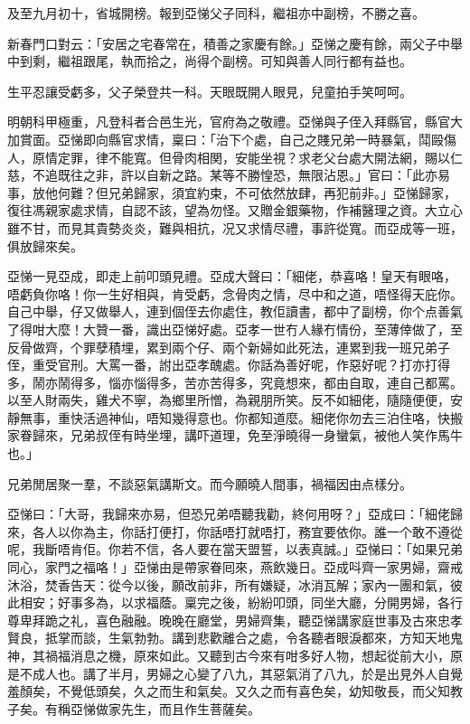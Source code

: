 \documentclass[a5paper, 12pt, openany]{book} %
\begin{document}
	及至九月初十，省城開榜。報到亞悌父子同科，繼祖亦中副榜，不勝之喜。

	新春門口對云：「安居之宅春常在，積善之家慶有餘。」亞悌之慶有餘，兩父子中舉中到剩，繼祖跟尾，執而拾之，尚得个副榜。可知與善人同行都有益也。

	生平忍讓受虧多，父子榮登共一科。天眼既開人眼見，兒童拍手笑呵呵。

	明朝科甲極重，凡登科者合邑生光，官府為之敬禮。亞悌與子侄入拜縣官，縣官大加賞面。亞悌即向縣官求情，稟曰：「治下个處，自己之賤兄弟一時暴氣，鬦毆傷人，原情定罪，律不能寬。但骨肉相関，安能坐視？求老父台處大開法網，賜以仁慈，不追既往之非，許以自新之路。某等不勝惶恐，無限沾恩。」官曰：「此亦易事，放他何難？但兄弟歸家，須宜約束，不可依然放肆，再犯前非。」亞悌歸家，復往馮親家處求情，自認不該，望為勿怪。又贈金銀藥物，作補醫理之資。大立心雖不甘，而見其貴勢炎炎，難與相抗，况又求情尽禮，事許從寬。而亞成等一班，俱放歸來矣。

	亞悌一見亞成，即走上前叩頭見禮。亞成大聲曰：「細佬，恭喜咯！皇天有眼咯，唔虧負你咯！你一生好相與，肯受虧，念骨肉之情，尽中和之道，唔怪得天庇你。自己中舉，仔又做舉人，連到個侄去你處住，教佢讀書，都中了副榜，你个点善氣了得咁大麼！大贊一番，識出亞悌好處。亞孝一世冇人緣冇情份，至薄倖做了，至反骨做齊，个罪孽積埋，累到兩个仔、兩个新婦如此死法，連累到我一班兄弟子侄，重受官刑。大罵一番，詂出亞孝醜處。你話為善好呢，作惡好呢？打亦打得多，鬧亦鬧得多，惱亦惱得多，苦亦苦得多，究竟想來，都由自取，連自己都罵。以至人財兩失，雞犬不寧，為鄉里所憎，為親朋所笑。反不如細佬，隨隨便便，安靜無事，重快活過神仙，唔知幾得意也。你都知道麼。細佬你勿去三泊住咯，快搬家眷歸來，兄弟叔侄有時坐埋，講吓道理，免至淨曉得一身蠻氣，被他人笑作馬牛也。」

	兄弟閒居聚一羣，不談惡氣講斯文。而今願曉人間事，禍福因由点樣分。

	亞悌曰：「大哥，我歸來亦易，但恐兄弟唔聽我勸，終何用呀？」亞成曰：「細佬歸來，各人以你為主，你話打便打，你話唔打就唔打，務宜要依你。誰一个敢不遵從呢，我斷唔肯佢。你若不信，各人要在當天盟誓，以表真誠。」亞悌曰：「如果兄弟同心，家門之福咯！」亞悌由是帶家眷囘來，燕飲幾日。亞成呌齊一家男婦，齋戒沐浴，焚香告天：從今以後，願改前非，所有嫌疑，冰消瓦解；家內一團和氣，彼此相安；好事多為，以求福蔭。稟完之後，紛紛叩頭，同坐大廳，分開男婦，各行尊卑拜跪之礼，喜色融融。晚晚在廳堂，男婦齊集，聽亞悌講家庭世事及古來忠孝賢良，抵掌而談，生氣勃勃。講到悲歡離合之處，令各聽者眼淚都來，方知天地鬼神，其禍福消息之機，原來如此。又聽到古今來有咁多好人物，想起從前大小，原是不成人也。講了半月，男婦之心變了八九，其惡氣消了八九，於是出見外人自覺羞顏矣，不覺低頭矣，久之而生和氣矣。又久之而有喜色矣，幼知敬長，而父知教子矣。有稱亞悌做家先生，而且作生菩薩矣。
\end{document}
